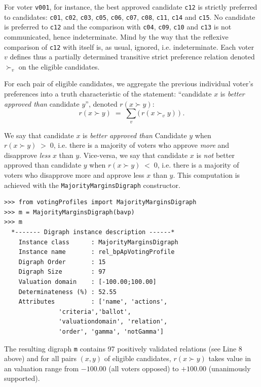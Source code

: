 For voter \texttt{v001}, for instance, the best approved candidate \texttt{c12} is strictly preferred to candidates: \texttt{c01}, \texttt{c02}, \texttt{c03}, \texttt{c05}, \texttt{c06}, \texttt{c07}, \texttt{c08}, \texttt{c11}, \texttt{c14} and \texttt{c15}. No candidate is preferred to \texttt{c12} and the comparison with \texttt{c04}, \texttt{c09}, \texttt{c10} and \texttt{c13} is not communicated, hence indeterminate. Mind by the way that the reflexive comparison of \texttt{c12} with itself is, as usual, ignored, i.e. indeterminate. Each voter $v$ defines thus a partially determined transitive strict preference relation denoted $\succ_v$ on the eligible candidates.

For each pair of eligible candidates, we aggregate the previous individual voter's preferences into a truth characteristic of the statement: ``candidate $x$ is \emph{better approved than} candidate $y$'', denoted $r(x \succ y)$:
\begin{equation}
  r(x \succ y)\;=\; \sum_v \big(\,r(x \succ_v y)\, \big)\;.
\end{equation}  

We say that candidate $x$ is \emph{better approved than} Candidate $y$ when $r(x \succ y)\;>\;0$, i.e. there is a majority of voters who approve \emph{more} and disapprove \emph{less} $x$ than $y$. Vice-versa, we say that candidate $x$ is \emph{not} better approved than candidate $y$ when $r(x \succ y)\;<\;0$, i.e. there is a majority of voters who disapprove more and approve less $x$ than $y$. This computation is achieved with the \texttt{MajorityMarginsDigraph} constructor.
\begin{lstlisting}
>>> from votingProfiles import MajorityMarginsDigraph
>>> m = MajorityMarginsDigraph(bavp)
>>> m
  *------- Digraph instance description ------*
    Instance class      : MajorityMarginsDigraph
    Instance name       : rel_bpApVotingProfile
    Digraph Order       : 15
    Digraph Size        : 97
    Valuation domain    : [-100.00;100.00]
    Determinateness (%) : 52.55
    Attributes          : ['name', 'actions',
               'criteria','ballot',
               'valuationdomain', 'relation',
               'order', 'gamma', 'notGamma']
\end{lstlisting}

The resulting digraph \texttt{m} contains 97 positively validated relations (see Line 8 above) and for all pairs $(x,y)$ of eligible candidates, $r(x \succ y)$ takes value in an valuation range from $-100.00$ (all voters opposed) to $+100.00$ (unanimously supported).

